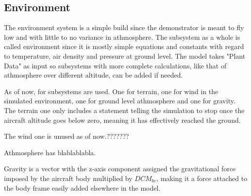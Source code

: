 \subsection{Environment}

The environment system is a simple build since the demonstrator is meant to fly low and with little to no variance in athmosphere. The subsystem as a whole is called environment since it is mostly simple equations and constants with regard to temperature, air density and pressure at ground level. The model takes "Plant Data" as input so subsystems with more complete calculations, like that of athmosphere over different altitude, can be added if needed.

As of now, for subsystems are used. One for terrain, one for wind in the simulated environment, one for ground level athmosphere and one for gravity. The terrain one only includes a statement telling the simulation to stop once the aircraft altitude goes below zero, meaning it has effectively reached the ground.

The wind one is unused as of now.???????

Athmosphere has blablablabla.

Gravity is a vector with the z-axis component assigned the gravitational force imposed by the aircraft body multiplied by $DCM_{be}$, making it a force attached to the body frame easily added elsewhere in the model. 
